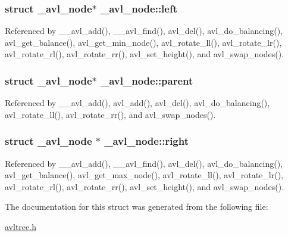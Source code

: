 \hypertarget{struct__avl__node_a814c986617033a95fa0aa814e0f7cc42}{
\subsubsection[{left}]{\setlength{\rightskip}{0pt plus 5cm}struct {\bf \-\_\-avl\-\_\-node}$\ast$ \-\_\-avl\-\_\-node\-::left}}\label{struct__avl__node_a814c986617033a95fa0aa814e0f7cc42}


Referenced by \-\_\-\-\_\-avl\-\_\-add(), \-\_\-\-\_\-avl\-\_\-find(), avl\-\_\-del(), avl\-\_\-do\-\_\-balancing(), avl\-\_\-get\-\_\-balance(), avl\-\_\-get\-\_\-min\-\_\-node(), avl\-\_\-rotate\-\_\-ll(), avl\-\_\-rotate\-\_\-lr(), avl\-\_\-rotate\-\_\-rl(), avl\-\_\-rotate\-\_\-rr(), avl\-\_\-set\-\_\-height(), and avl\-\_\-swap\-\_\-nodes().

\hypertarget{struct__avl__node_ad568e44f1e071b12670532cddae02e5e}{
\subsubsection[{parent}]{\setlength{\rightskip}{0pt plus 5cm}struct {\bf \-\_\-avl\-\_\-node}$\ast$ \-\_\-avl\-\_\-node\-::parent}}\label{struct__avl__node_ad568e44f1e071b12670532cddae02e5e}


Referenced by \-\_\-\-\_\-avl\-\_\-add(), avl\-\_\-add(), avl\-\_\-del(), avl\-\_\-do\-\_\-balancing(), avl\-\_\-rotate\-\_\-ll(), avl\-\_\-rotate\-\_\-rr(), and avl\-\_\-swap\-\_\-nodes().

\hypertarget{struct__avl__node_a2481d9ea521cc380c32132c7837c9f84}{
\subsubsection[{right}]{\setlength{\rightskip}{0pt plus 5cm}struct {\bf \-\_\-avl\-\_\-node} $\ast$ \-\_\-avl\-\_\-node\-::right}}\label{struct__avl__node_a2481d9ea521cc380c32132c7837c9f84}


Referenced by \-\_\-\-\_\-avl\-\_\-add(), \-\_\-\-\_\-avl\-\_\-find(), avl\-\_\-del(), avl\-\_\-do\-\_\-balancing(), avl\-\_\-get\-\_\-balance(), avl\-\_\-get\-\_\-max\-\_\-node(), avl\-\_\-rotate\-\_\-ll(), avl\-\_\-rotate\-\_\-lr(), avl\-\_\-rotate\-\_\-rl(), avl\-\_\-rotate\-\_\-rr(), avl\-\_\-set\-\_\-height(), and avl\-\_\-swap\-\_\-nodes().



The documentation for this struct was generated from the following file\-:\begin{DoxyCompactItemize}
\item 
\hyperlink{avltree_8h}{avltree.\-h}\end{DoxyCompactItemize}
